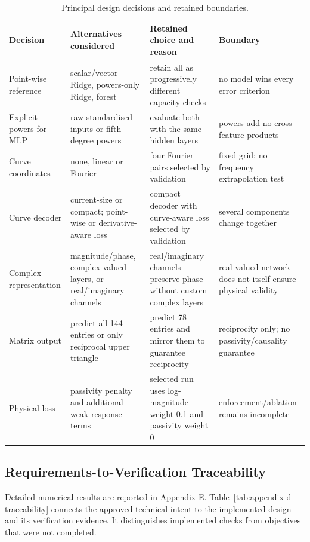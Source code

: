 \begin{table}[t]
    \caption{Principal design decisions and retained boundaries.}
    \label{tab:appendix-d-decisions}
    \centering
    \scriptsize
    \begin{tabular}{@{}p{}p{}
                         p{}p{}@{}}
        \toprule
        Decision & Alternatives considered & Retained choice and reason
                 & Boundary \\
        \midrule
        Point-wise reference
          & scalar/vector Ridge, powers-only Ridge, forest
          & retain all as progressively different capacity checks
          & no model wins every error criterion \\
        Explicit powers for MLP
          & raw standardised inputs or fifth-degree powers
          & evaluate both with the same hidden layers
          & powers add no cross-feature products \\
        Curve coordinates
          & none, linear or Fourier
          & four Fourier pairs selected by validation
          & fixed grid; no frequency extrapolation test \\
        Curve decoder
          & current-size or compact; point-wise or derivative-aware loss
          & compact decoder with curve-aware loss selected by validation
          & several components change together \\
        Complex representation
          & magnitude/phase, complex-valued layers, or real/imaginary channels
          & real/imaginary channels preserve phase without custom complex layers
          & real-valued network does not itself ensure physical validity \\
        Matrix output
          & predict all 144 entries or only reciprocal upper triangle
          & predict 78 entries and mirror them to guarantee reciprocity
          & reciprocity only; no passivity/causality guarantee \\
        Physical loss
          & passivity penalty and additional weak-response terms
          & selected run uses log-magnitude weight 0.1 and passivity weight 0
          & enforcement/ablation remains incomplete \\
        \bottomrule
    \end{tabular}
\end{table}

\subsection{Requirements-to-Verification Traceability}
Detailed numerical results are reported in Appendix E.
Table~\ref{tab:appendix-d-traceability} connects the approved technical intent
to the implemented design and its verification evidence. It distinguishes
implemented checks from objectives that were not completed.

